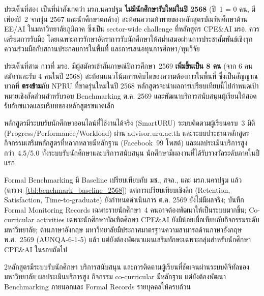 ประเด็นที่สอง เป็นที่น่าสังเกตว่า มรภ.นครปฐม \textbf{ไม่มีนักศึกษารับใหม่ในปี 2568} (ปี~1 = 0 คน, มีเพียงปี~2 จากรุ่น 2567 และนักศึกษาตกค้าง) สะท้อนความท้าทายของหลักสูตรบัณฑิตศึกษาด้าน EE/AI ในมหาวิทยาลัยภูมิภาค ซึ่งเป็น sector-wide challenge ที่หลักสูตร CPE\&AI มรอ. ควรเตรียมการรับมือ โดยเฉพาะการรักษาอัตราการรับนักศึกษาให้สม่ำเสมอผ่านการประชาสัมพันธ์เชิงรุก ความร่วมมือกับสถานประกอบการในพื้นที่ และการเสนอทุนการศึกษา/ทุนวิจัย

ประเด็นที่สาม การที่ มรอ. มีผู้สมัครเข้าสัมภาษณ์ปีการศึกษา~2569 \textbf{เพิ่มขึ้นเป็น 8 คน} (จาก 6 คนสมัครและรับ 4 คนในปี 2568) สะท้อนแนวโน้มการเติบโตของความต้องการในพื้นที่ ซึ่งเป็นสัญญาณบวกที่ \textbf{ตรงข้าม}กับ NPRU ที่ขาดรุ่นใหม่ในปี 2568 หลักสูตรจะนำผลการเปรียบเทียบนี้ไปกำหนดเป้าหมายเชิงสัดส่วนสำหรับรอบ Benchmarking ต.ค. 2569 และพัฒนาบริการสนับสนุนผู้เรียนให้สอดรับกับขนาดและบริบทของหลักสูตรขนาดเล็ก

\begin{strengthbox}
หลักสูตรมีระบบรับนักศึกษาออนไลน์ที่ใช้งานได้จริง (SmartURU) ระบบติดตามผู้เรียนครบ~3 มิติ (Progress/Performance/Workload) ผ่าน advisor.uru.ac.th และระบบประธานหลักสูตร กิจกรรมเสริมหลักสูตรที่หลากหลายมีหลักฐาน (Facebook~99 โพสต์) และผลประเมินบริการสูงกว่า~4.5/5.0 ทั้งระบบรับนักศึกษาและบริการสนับสนุน นักศึกษามีผลงานที่ได้รับรางวัลระดับภาคในปีแรก
\end{strengthbox}

\begin{weaknessbox}
Formal Benchmarking มี Baseline เปรียบเทียบกับ มช., สจล., และ มรภ.นครปฐม แล้ว (ตาราง~\ref{tbl:benchmark_baseline_2568}) แต่การเปรียบเทียบเชิงลึก (Retention, Satisfaction, Time-to-graduate) ยังกำหนดดำเนินการ ต.ค. 2569 ยังไม่มีผลจริง; บันทึก Formal Monitoring Records เฉพาะรายนักศึกษา~4 คนอาจต้องพัฒนาให้เป็นระบบมากขึ้น; Co-curricular activities เฉพาะนักศึกษาบัณฑิตศึกษา CPE\&AI ยังมีน้อยเมื่อเทียบกับกิจกรรมระดับมหาวิทยาลัย; ด้านภาษาอังกฤษ มหาวิทยาลัยมีประกาศมาตรฐานความสามารถด้านภาษาอังกฤษ พ.ศ.~2569 (AUNQA-6-1-5) แล้ว แต่ยังต้องพัฒนาแผนเสริมทักษะเฉพาะกลุ่มสำหรับนักศึกษา CPE\&AI ในรอบถัดไป
\end{weaknessbox}

\begin{selfassessmentbox}{2}{หลักสูตรมีระบบรับนักศึกษา บริการสนับสนุน และการติดตามผู้เรียนที่ชัดเจนผ่านระบบดิจิทัลของมหาวิทยาลัย ผลประเมินบริการสูง กิจกรรม co-curricular มีหลักฐาน แต่ยังต้องพัฒนา Benchmarking ภายนอกและ Formal Records รายบุคคลให้ครบถ้วน}
\end{selfassessmentbox}

